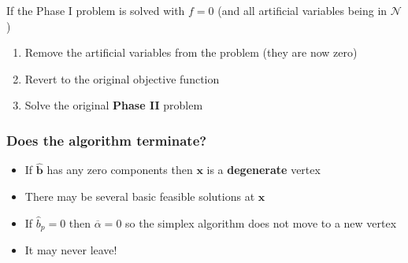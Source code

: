 \documentclass[11pt,a4paper]{article}
\begin{document}
If the Phase I problem is solved with $f=0$ (and all artificial variables being in $\mathcal{N}$)
\begin{enumerate}
	\item Remove the artificial variables from the problem (they are now zero)
	\item Revert to the original objective function
	\item Solve the original \textbf{Phase II} problem
\end{enumerate}

\subsubsection*{Does the algorithm terminate?}
\begin{itemize}
	\item If $\widehat{\textbf{b}}$ has any zero components then $\textbf{x}$ is a \textbf{degenerate} vertex
	\item There may be several basic feasible solutions at $\textbf{x}$
	\item If $\widehat{b}_p = 0$ then $\overline{\alpha} = 0$ so the simplex algorithm does not move to a new vertex
	\item It may never leave!
\end{itemize}
\end{document}
